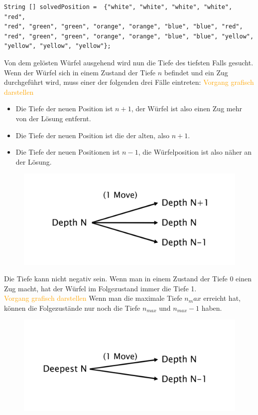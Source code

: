 \documentclass[12pt,a4paper, usenames, dvipsnames]{scrartcl}
\begin{document}
\begin{verbatim}
String [] solvedPosition =  {"white", "white", "white", "white", "red", 
"red", "green", "green", "orange", "orange", "blue", "blue", "red", 
"red", "green", "green", "orange", "orange", "blue", "blue", "yellow", 
"yellow", "yellow", "yellow"};
\end{verbatim}
Von dem gelösten Würfel ausgehend wird nun die Tiefe des tiefsten Falls gesucht. \\
Wenn der Würfel sich in einem Zustand der Tiefe $n$ befindet und ein Zug durchgeführt wird, muss einer der folgenden drei Fälle eintreten: \textcolor{orange}{Vorgang grafisch darstellen} \\ 
\begin{itemize}
	\item Die Tiefe der neuen Position ist $n+1$, der Würfel ist also einen Zug mehr von der Lösung entfernt.
	\item Die Tiefe der neuen Position ist die der alten, also $n+1$.
	\item Die Tiefe der neuen Positionen ist $n-1$, die Würfelposition ist also näher an der Lösung.
\end{itemize}
\begin{figure}[h]
\centering
\includegraphics[scale=0.16]{graphDepth.png}
\end{figure}
Die Tiefe kann nicht negativ sein. Wenn man in einem Zustand der Tiefe $0$ einen Zug macht, hat der Würfel im Folgezustand immer die Tiefe 1. \\ \textcolor{orange}{Vorgang grafisch darstellen}
Wenn man die maximale Tiefe $n_max$ erreicht hat, können die Folgezustände nur noch die Tiefe $n_{max}$ und $n_{max} -1$ haben. 
\begin{figure}[h]
\centering
\includegraphics[scale=0.2]{graphDepthN.png}
\end{figure}
\end{document}
